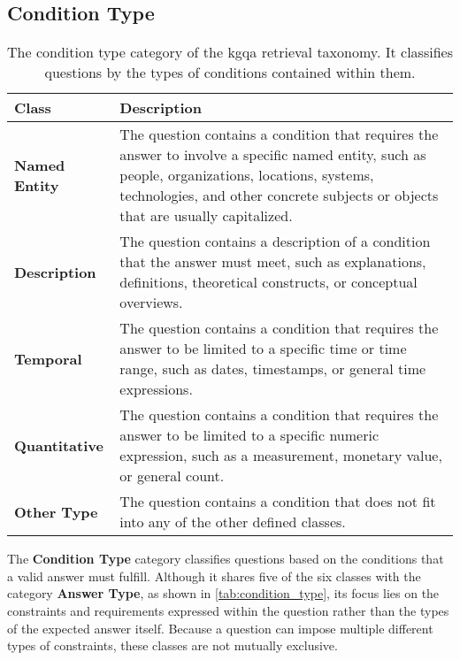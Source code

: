 \subsection{Condition Type}

\begin{table}[t]
    \centering
    \begin{tabular}{@{}lp{8cm}@{}}
        \toprule
        \textbf{Class} & \textbf{Description} \\
        \midrule
        \textbf{Named Entity}
            & The question contains a condition that requires the answer to involve a specific named entity, such as people, organizations, locations, systems, technologies, and other concrete subjects or objects that are usually capitalized. \\
        \cmidrule(l){1-2}
            \textbf{Description}
            & The question contains a description of a condition that the answer must meet, such as explanations, definitions, theoretical constructs, or conceptual overviews. \\
        \cmidrule(l){1-2}
            \textbf{Temporal}
            & The question contains a condition that requires the answer to be limited to a specific time or time range, such as dates, timestamps, or general time expressions. \\
        \cmidrule(l){1-2}
            \textbf{Quantitative}
            & The question contains a condition that requires the answer to be limited to a specific numeric expression, such as a measurement, monetary value, or general count. \\
        \cmidrule(l){1-2}
            \textbf{Other Type}
            &  The question contains a condition that does not fit into any of the other defined classes. \\
        \bottomrule
    \end{tabular}
    \caption[Condition Type Category of the Taxonomy]{The condition type category of the \gls{kgqa} retrieval taxonomy. It classifies questions by the types of conditions contained within them.}
    \label{tab:condition_type}
\end{table}

The \textbf{Condition Type} category classifies questions based on the conditions that a valid answer must fulfill. Although it shares five of the six classes with the category \textbf{Answer Type}, as shown in \autoref{tab:condition_type}, its focus lies on the constraints and requirements expressed within the question rather than the types of the expected answer itself. Because a question can impose multiple different types of constraints, these classes are not mutually exclusive.

